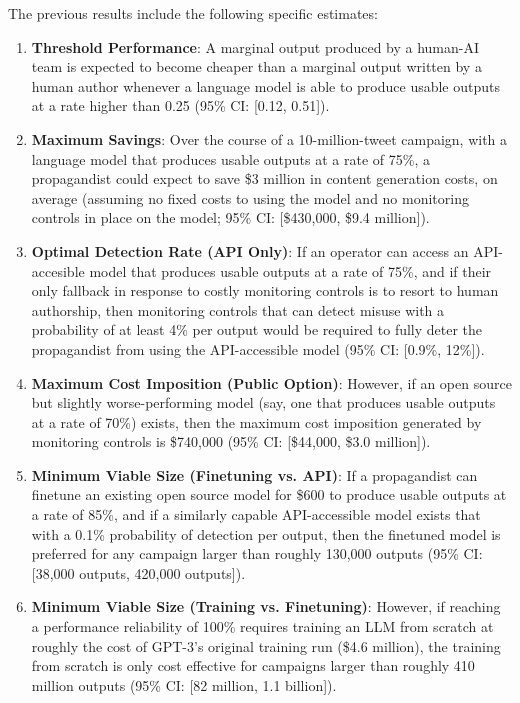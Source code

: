 \documentclass{article}
\begin{document}
The previous results include the following specific estimates: 

\begin{enumerate}
  \item \textbf{Threshold Performance}: A marginal output produced by a human-AI team is expected to become cheaper than a marginal output written by a human author whenever a language model is able to produce usable outputs at a rate higher than 0.25 (95\% CI: [0.12, 0.51]).
  \item \textbf{Maximum Savings}: Over the course of a 10-million-tweet campaign, with a language model that produces usable outputs at a rate of 75\%, a propagandist could expect to save \$3 million in content generation costs, on average (assuming no fixed costs to using the model and no monitoring controls in place on the model; 95\% CI: [\$430,000, \$9.4 million]).
  \item \textbf{Optimal Detection Rate (API Only)}: If an operator can access an API-accesible model that produces usable outputs at a rate of 75\%, and if their only fallback in response to costly monitoring controls is to resort to human authorship, then monitoring controls that can detect misuse with a probability of at least 4\% per output would be required to fully deter the propagandist from using the API-accessible model (95\% CI: [0.9\%, 12\%]).
  \item \textbf{Maximum Cost Imposition (Public Option)}: However, if an open source but slightly worse-performing model (say, one that produces usable outputs at a rate of 70\%) exists, then the maximum cost imposition generated by monitoring controls is \$740,000 (95\% CI: [\$44,000, \$3.0 million]).
  \item \textbf{Minimum Viable Size (Finetuning vs. API)}: If a propagandist can finetune an existing open source model for \$600 to produce usable outputs at a rate of 85\%, and if a similarly capable API-accessible model exists that with a 0.1\% probability of detection per output, then the finetuned model is preferred for any campaign larger than roughly 130,000 outputs (95\% CI: [38,000 outputs, 420,000 outputs]).
  \item \textbf{Minimum Viable Size (Training vs. Finetuning)}: However, if reaching a performance reliability of 100\% requires training an LLM from scratch at roughly the cost of GPT-3's original training run (\$4.6 million), the training from scratch is only cost effective for campaigns larger than roughly 410 million outputs (95\% CI: [82 million, 1.1 billion]).
\end{enumerate}
\end{document}
